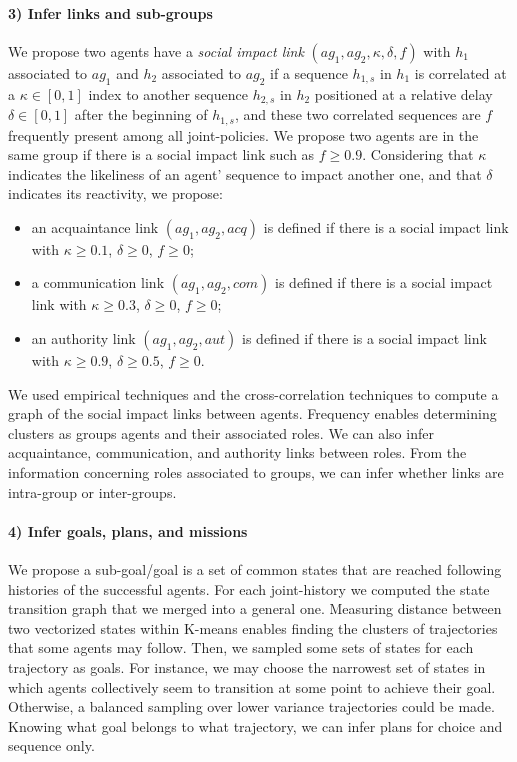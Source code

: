 \documentclass{ecai}
\newcounter{relation}
\begin{document}
\paragraph{3) Infer links and sub-groups}

We propose two agents have a \emph{social impact link} $(ag_1,ag_2, \kappa, \delta, f)$ with $h_1$ associated to $ag_1$ and $h_2$ associated to $ag_2$ if a sequence $h_{1,s}$ in $h_1$ is correlated at a $\kappa \in [0,1]$ index to another sequence $h_{2,s}$ in $h_2$ positioned at a relative delay $\delta \in [0,1]$ after the beginning of $h_{1,s}$, and these two correlated sequences are $f$ frequently present among all joint-policies.
We propose two agents are in the same group if there is a social impact link such as $f \geq 0.9$. Considering that $\kappa$ indicates the likeliness of an agent' sequence to impact another one, and that $\delta$ indicates its reactivity, we propose:
\begin{itemize}
    \item an acquaintance link $(ag_1,ag_2,acq)$ is defined if there is a social impact link with $\kappa \geq 0.1$, $\delta \geq 0$, $f \geq 0$;
    \item a communication link $(ag_1,ag_2,com)$ is defined if there is a social impact link with $\kappa \geq 0.3$, $\delta \geq 0$, $f \geq 0$;
    \item an authority link $(ag_1,ag_2,aut)$ is defined if there is a social impact link with $\kappa \geq 0.9$, $\delta \geq 0.5$, $f \geq 0$.
\end{itemize}
We used empirical techniques and the cross-correlation techniques to compute a graph of the social impact links between agents. Frequency enables determining clusters as groups agents and their associated roles. We can also infer acquaintance, communication, and authority links between roles. From the information concerning roles associated to groups, we can infer whether links are intra-group or inter-groups.

\paragraph{4) Infer goals, plans, and missions}

We propose a sub-goal/goal is a set of common states that are reached following histories of the successful agents.
For each joint-history we computed the state transition graph that we merged into a general one. Measuring distance between two vectorized states within K-means enables finding the clusters of trajectories that some agents may follow. Then, we sampled some sets of states for each trajectory as goals. For instance, we may choose the narrowest set of states in which agents collectively seem to transition at some point to achieve their goal. Otherwise, a balanced sampling over lower variance trajectories could be made. Knowing what goal belongs to what trajectory, we can infer plans for choice and sequence only.
\end{document}
